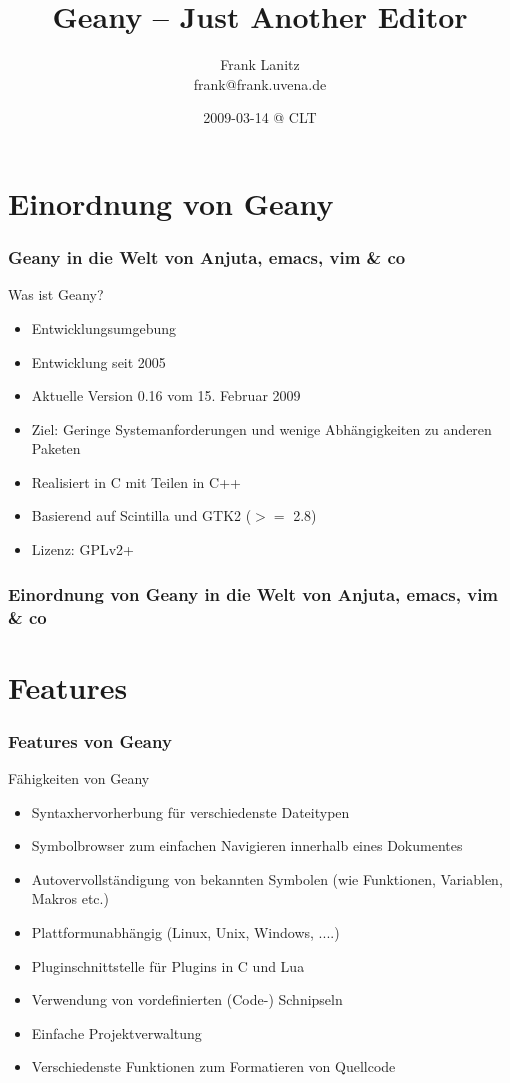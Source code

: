 \documentclass[compress]{beamer}
\title{Geany -- Just Another Editor}
\author{Frank Lanitz \\ frank@frank.uvena.de}
\date{2009-03-14 @ CLT}
\begin{document}
\frame{\titlepage}
\frame{\tableofcontents}

\section{Einordnung von Geany}
\begin{frame}
	\frametitle{Geany in die Welt von Anjuta, emacs, vim \& co}
	\begin{block}{Was ist Geany?}
		\begin{itemize}
			\item Entwicklungsumgebung
			\item Entwicklung seit 2005
			\item Aktuelle Version 0.16 vom 15. Februar 2009
			\item Ziel: Geringe Systemanforderungen und wenige
				  Abhängigkeiten zu anderen Paketen
			\item Realisiert in C mit Teilen in C++
			\item Basierend auf Scintilla und GTK2 ($>=$ 2.8)
			\item Lizenz: GPLv2+
		\end{itemize}
	\end{block}
\end{frame}

\begin{frame}
	\frametitle{Einordnung von Geany in die Welt von Anjuta, emacs, vim \& co}
	\begin{figure}[ht]
		\centering
 		\footnotesize
		
	\end{figure}
\end{frame}


\section{Features}
\begin{frame}[allowframebreak]
	\frametitle{Features von Geany}
	\begin{block}{Fähigkeiten von Geany}
		\begin{itemize}
			\item Syntaxhervorherbung für verschiedenste Dateitypen
			\item Symbolbrowser zum einfachen Navigieren innerhalb
			      eines Dokumentes
			\item Autovervollständigung von bekannten Symbolen (wie
				  Funktionen, Variablen, Makros etc.)
			\item Plattformunabhängig (Linux, Unix, Windows, ....)
			\item Pluginschnittstelle für Plugins in C und Lua
			\item Verwendung von vordefinierten (Code-) Schnipseln
			\item Einfache Projektverwaltung
			\item Verschiedenste Funktionen zum Formatieren von Quellcode
		\end{itemize}
	\end{block}
\end{frame}
\end{document}
